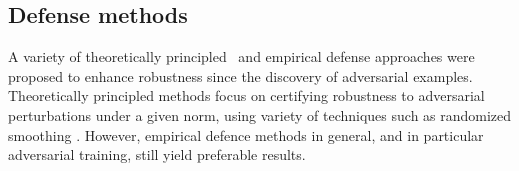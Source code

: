 \subsection{Defense methods}
A variety of theoretically principled~\citep{raghunathan2018certified, sinha2017certifiable, raghunathan2018semidefinite, wong2018scaling, wong2018provable, gowal2018effectiveness} and empirical defense approaches \citep{bai2021recent} were proposed to enhance robustness since the discovery of adversarial examples. 
Theoretically principled methods focus on certifying robustness to adversarial perturbations under a given norm, using variety of techniques such as randomized smoothing \citep{cohen2019certified}. However, empirical defence methods in general, and in particular adversarial training, still yield preferable results.

